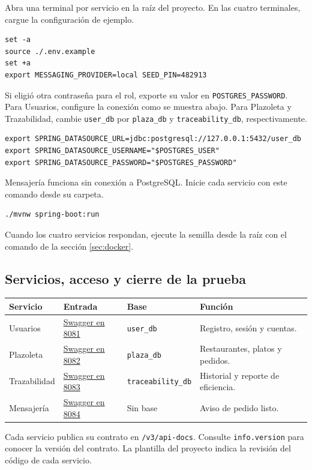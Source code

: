 \documentclass[11pt,a4paper]{article}
\newcommand{\code}[1]{\nolinkurl{#1}}
\newcommand{\swagger}[1]{\href{http://localhost:#1/swagger-ui/index.html}{Swagger en #1}}
\begin{document}
Abra una terminal por servicio en la raíz del proyecto. En las cuatro terminales, cargue la configuración de ejemplo.
\begin{lstlisting}
set -a
source ./.env.example
set +a
export MESSAGING_PROVIDER=local SEED_PIN=482913
\end{lstlisting}

Si eligió otra contraseña para el rol, exporte su valor en \code{POSTGRES_PASSWORD}. Para Usuarios, configure la conexión como se muestra abajo. Para Plazoleta y Trazabilidad, cambie \code{user_db} por \code{plaza_db} y \code{traceability_db}, respectivamente.
\begin{lstlisting}
export SPRING_DATASOURCE_URL=jdbc:postgresql://127.0.0.1:5432/user_db
export SPRING_DATASOURCE_USERNAME="$POSTGRES_USER"
export SPRING_DATASOURCE_PASSWORD="$POSTGRES_PASSWORD"
\end{lstlisting}

Mensajería funciona sin conexión a PostgreSQL. Inicie cada servicio con este comando desde su carpeta.
\begin{lstlisting}
./mvnw spring-boot:run
\end{lstlisting}

Cuando los cuatro servicios respondan, ejecute la semilla desde la raíz con el comando de la sección \ref{sec:docker}.

\clearpage
\subsection{Servicios, acceso y cierre de la prueba}
\begin{minipage}{\linewidth}
\begin{tabularx}{\linewidth}{@{}P{33mm}P{34mm}P{31mm}Y@{}}
\toprule
Servicio & Entrada & Base & Función \\
\midrule
Usuarios & \swagger{8081} & \code{user_db} & Registro, sesión y cuentas. \\
Plazoleta & \swagger{8082} & \code{plaza_db} & Restaurantes, platos y pedidos. \\
Trazabilidad & \swagger{8083} & \code{traceability_db} & Historial y reporte de eficiencia. \\
Mensajería & \swagger{8084} & Sin base & Aviso de pedido listo. \\
\bottomrule
\end{tabularx}
\end{minipage}

Cada servicio publica su contrato en \code{/v3/api-docs}. Consulte \code{info.version} para conocer la versión del contrato. La plantilla del proyecto indica la revisión del código de cada servicio.
\end{document}
